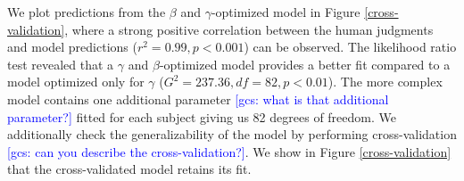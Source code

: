 \documentclass[10pt,a4paper]{article}
\newcommand{\gcs}[1]{\textcolor{blue}{[gcs: #1]}}
\begin{document}

 

We plot predictions from the $\beta$ and $\gamma$-optimized model in Figure \ref{cross-validation}, where a strong positive correlation between the human judgments and model predictions ($r^2 = 0.99, p < 0.001$) can be observed. The likelihood ratio test revealed that a $\gamma$ and $\beta$-optimized model provides a better fit compared to a model optimized only for $\gamma$ ($G^2 = 237.36, df = 82, p < 0.01$). The more complex model contains one additional parameter \gcs{what is that additional parameter?} fitted for each subject giving us 82 degrees of freedom. We additionally check the generalizability of the model by performing cross-validation \gcs{can you describe the cross-validation?}. We show in Figure \ref{cross-validation} that the cross-validated model retains its fit.
\end{document}
